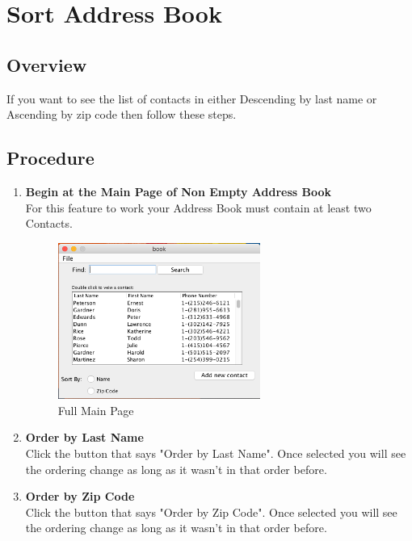 \documentclass[a4paper, 11pt]{article}
\begin{document}
\clearpage

\section{Sort Address Book}
\subsection{Overview}
If you want to see the list of contacts in either Descending by last name or Ascending by zip code then follow these steps. 
\subsection{Procedure}
\begin{enumerate}[label=\textbf{\arabic*})]
    \item{\textbf{Begin at the Main Page of Non Empty Address Book}}\\ For this feature to work your Address Book must contain at least two Contacts.
    
    \begin{figure}[h!]
    \centering
      \includegraphics[width=250]{main_page_full.png}
      \caption{Full Main Page}
    \end{figure}
    
    \item{\textbf{Order by Last Name}}\\ Click the button that says "Order by Last Name". Once selected you will see the ordering change as long as it wasn't in that order before. 
    
    \item{\textbf{Order by Zip Code}}\\ Click the button that says "Order by Zip Code". Once selected you will see the ordering change as long as it wasn't in that order before.
\end{enumerate}
\end{document}
